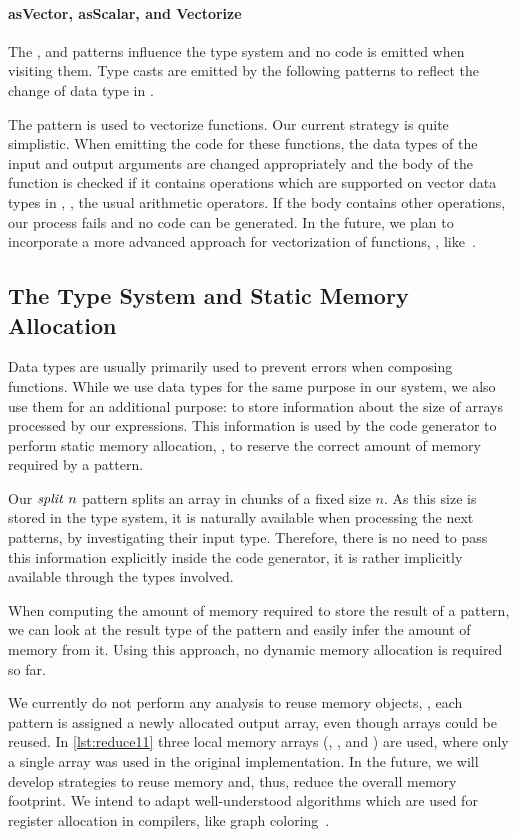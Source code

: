\paragraph{{\footnotesize as}Vector, {\footnotesize as}Scalar, and Vectorize}
The \asVector, and \asScalar patterns influence the type system and no \OpenCL code is emitted when visiting them.
Type casts are emitted by the following patterns to reflect the change of data type in \OpenCL.

The \vect pattern is used to vectorize functions.
Our current strategy is quite simplistic.
When emitting the \OpenCL code for these functions, the data types of the input and output arguments are changed appropriately and the body of the function is checked if it contains operations which are supported on vector data types in \OpenCL, \eg, the usual arithmetic operators.
If the body contains other operations, our process fails and no \OpenCL code can be generated.
In the future, we plan to incorporate a more advanced approach for vectorization of functions, \eg, like~\cite{KarrenbergHa2011}.


\subsection{The Type System and Static Memory Allocation}
\label{section:typeSystem}
Data types are usually primarily used to prevent errors when composing functions.
While we use data types for the same purpose in our system, we also use them for an additional purpose: to store information about the size of arrays processed by our expressions.
This information is used by the code generator to perform static memory allocation, \ie, to reserve the correct amount of memory required by a pattern.

Our $\text{\textit{split}}\ n$ pattern splits an array in chunks of a fixed size $n$.
As this size is stored in the type system, it is naturally available when processing the next patterns, by investigating their input type.
Therefore, there is no need to pass this information explicitly inside the code generator, it is rather implicitly available through the types involved.

When computing the amount of memory required to store the result of a pattern, we can look at the result type of the pattern and easily infer the amount of memory from it.
Using this approach, no dynamic memory allocation is required so far.

We currently do not perform any analysis to reuse memory objects, \ie, each pattern is assigned a newly allocated output array, even though arrays could be reused.
In \autoref{lst:reduce11} three local memory arrays (, , and ) are used, where only a single array was used in the original \OpenCL implementation.
In the future, we will develop strategies to reuse memory and, thus, reduce the overall memory footprint.
We intend to adapt well-understood algorithms which are used for register allocation in compilers, like graph coloring~\cite{CooperTo2004}.

